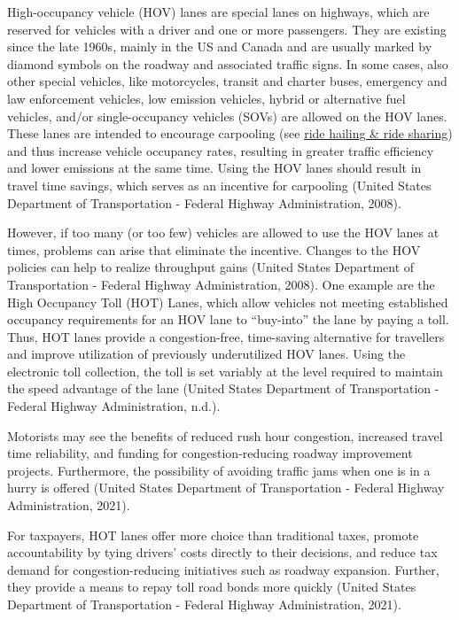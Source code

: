 \documentclass[
]{book}
\begin{document}
High-occupancy vehicle (HOV) lanes are special lanes on highways, which are reserved for vehicles with a driver and one or more passengers. They are existing since the late 1960s, mainly in the US and Canada and are usually marked by diamond symbols on the roadway and associated traffic signs. In some cases, also other special vehicles, like motorcycles, transit and charter buses, emergency and law enforcement vehicles, low emission vehicles, hybrid or alternative fuel vehicles, and/or single-occupancy vehicles (SOVs) are allowed on the HOV lanes. These lanes are intended to encourage carpooling (see \protect\hyperlink{ride_hailing}{ride hailing \& ride sharing}) and thus increase vehicle occupancy rates, resulting in greater traffic efficiency and lower emissions at the same time. Using the HOV lanes should result in travel time savings, which serves as an incentive for carpooling (United States Department of Transportation - Federal Highway Administration, 2008).

However, if too many (or too few) vehicles are allowed to use the HOV lanes at times, problems can arise that eliminate the incentive. Changes to the HOV policies can help to realize throughput gains (United States Department of Transportation - Federal Highway Administration, 2008). One example are the High Occupancy Toll (HOT) Lanes, which allow vehicles not meeting established occupancy requirements for an HOV lane to ``buy-into'' the lane by paying a toll. Thus, HOT lanes provide a congestion-free, time-saving alternative for travellers and improve utilization of previously underutilized HOV lanes. Using the electronic toll collection, the toll is set variably at the level required to maintain the speed advantage of the lane (United States Department of Transportation - Federal Highway Administration, n.d.).

Motorists may see the benefits of reduced rush hour congestion, increased travel time reliability, and funding for congestion-reducing roadway improvement projects. Furthermore, the possibility of avoiding traffic jams when one is in a hurry is offered (United States Department of Transportation - Federal Highway Administration, 2021).

For taxpayers, HOT lanes offer more choice than traditional taxes, promote accountability by tying drivers' costs directly to their decisions, and reduce tax demand for congestion-reducing initiatives such as roadway expansion. Further, they provide a means to repay toll road bonds more quickly (United States Department of Transportation - Federal Highway Administration, 2021).
\end{document}
